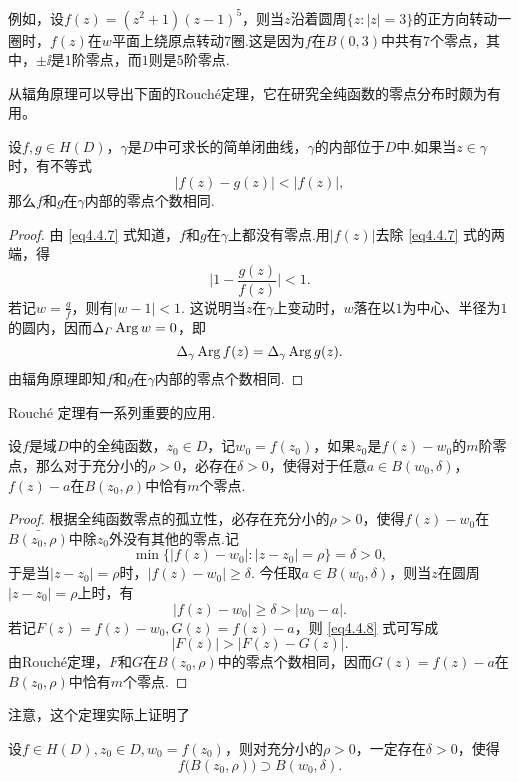 例如，设$f(z)=(z^2+1)(z-1)^5$，则当$z$沿着圆周$\{z:|z|=3\}$的正方向转动一圈时，$f(z)$在$w$平面上绕原点转动$7$圈.这是因为$f$在$B(0,3)$中共有$7$个零点，其中，$\pm\ii$是$1$阶零点，而$1$则是$5$阶零点.

从辐角原理可以导出下面的Rouch\'e定理，它在研究全纯函数的零点分布时颇为有用。
\begin{theorem}\label{thm4.4.3}
  设$f,g\in H(D)$，$\gamma$是$D$中可求长的简单闭曲线，$\gamma$的内部位于$D$中.如果当$z\in\gamma$时，有不等式
  \begin{equation}\label{eq4.4.7}
    |f(z) - g(z)| < |f(z)|,
  \end{equation}
  那么$f$和$g$在$\gamma$内部的零点个数相同.
\end{theorem}
\begin{proof}
  由 \eqref{eq4.4.7} 式知道，$f$和$g$在$\gamma$上都没有零点.用$|f(z)|$去除 \eqref{eq4.4.7} 式的两端，得
  \[
    \bigg|1 - \frac{g(z)}{f(z)} \bigg| < 1.
  \]
  若记$w=\frac gf$，则有$|w-1|<1$. 这说明当$z$在$\gamma$上变动时，$w$落在以$1$为中心、半径为$1$的圆内，因而$\Delta_\varGamma\operatorname{Arg} w=0$，即
  \[
    \Delta_\gamma\operatorname{Arg} f(z) = \Delta_\gamma\operatorname{Arg} g(z).
  \]
  由辐角原理即知$f$和$g$在$\gamma$内部的零点个数相同.
\end{proof}

Rouch\'e 定理有一系列重要的应用.
\begin{theorem}\label{thm4.4.4}
  设$f$是域$D$中的全纯函数，$z_0\in D$，记$w_0=f(z_0)$，如果$z_0$是$f(z)-w_0$的$m$阶零点，那么对于充分小的$\rho>0$，必存在$\delta>0$，使得对于任意$a\in B(w_0,\delta)$，$f(z)-a$在$B(z_0,\rho)$中恰有$m$个零点.
\end{theorem}
\begin{proof}
  根据全纯函数零点的孤立性，必存在充分小的$\rho>0$，使得$f(z)-w_0$在$\bar{B(z_0,\rho)}$中除$z_0$外没有其他的零点.记
  \[
    \min\{|f(z)-w_0|:|z-z_0| = \rho\} = \delta>0,
  \]
  于是当$|z-z_0|=\rho$时，$|f(z)-w_0|\ge\delta$. 今任取$a\in B(w_0,\delta)$，则当$z$在圆周$|z-z_0|=\rho$上时，有
  \begin{equation}\label{eq4.4.8}
    |f(z) - w_0| \ge \delta > |w_0 - a|.
  \end{equation}
  若记$F(z)=f(z)-w_0,G(z)=f(z)-a$，则 \eqref{eq4.4.8} 式可写成
  \[
    |F(z)| > |F(z) - G(z)|.
  \]
  由Rouch\'e定理，$F$和$G$在$B(z_0,\rho)$中的零点个数相同，因而$G(z)=f(z)-a$在$B(z_0,\rho)$中恰有$m$个零点.
\end{proof}

注意，这个定理实际上证明了
\begin{corollary}\label{cor4.4.5}
  设$f\in H(D),z_0\in D,w_0=f(z_0)$，则对充分小的$\rho>0$，一定存在$\delta>0$，使得
  \[
    f\big(B(z_0,\rho)\big) \supset B(w_0,\delta).
  \]
\end{corollary}

